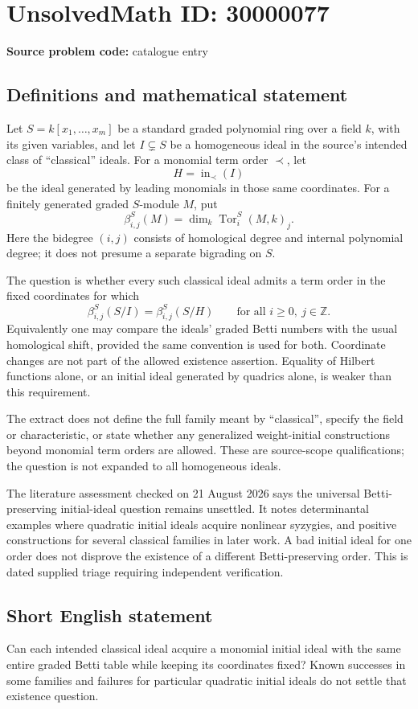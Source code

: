 \documentclass[11pt]{article}
\newcommand{\Z}{\mathbb{Z}}
\begin{document}
\section*{UnsolvedMath ID: 30000077}
\textbf{Source problem code:} catalogue entry
\subsection{Definitions and mathematical statement}
Let $S=k[x_1,\ldots,x_m]$ be a standard graded polynomial ring over a field $k$, with its given variables, and let $I\subsetneq S$ be a homogeneous ideal in the source's intended class of ``classical'' ideals. For a monomial term order $\prec$, let
\[
 H=\operatorname{in}_{\prec}(I)
\]
be the ideal generated by leading monomials in those same coordinates. For a finitely generated graded $S$-module $M$, put
\[
 \beta^S_{i,j}(M)=\dim_k\operatorname{Tor}^S_i(M,k)_j.
\]
Here the bidegree $(i,j)$ consists of homological degree and internal polynomial degree; it does not presume a separate bigrading on $S$.

The question is whether every such classical ideal admits a term order in the fixed coordinates for which
\[
 \beta^S_{i,j}(S/I)=\beta^S_{i,j}(S/H)
 \qquad\text{for all }i\ge0,\ j\in\Z.
\]
Equivalently one may compare the ideals' graded Betti numbers with the usual homological shift, provided the same convention is used for both. Coordinate changes are not part of the allowed existence assertion. Equality of Hilbert functions alone, or an initial ideal generated by quadrics alone, is weaker than this requirement.

The extract does not define the full family meant by ``classical'', specify the field or characteristic, or state whether any generalized weight-initial constructions beyond monomial term orders are allowed. These are source-scope qualifications; the question is not expanded to all homogeneous ideals.

The literature assessment checked on 21 August 2026 says the universal Betti-preserving initial-ideal question remains unsettled. It notes determinantal examples where quadratic initial ideals acquire nonlinear syzygies, and positive constructions for several classical families in later work. A bad initial ideal for one order does not disprove the existence of a different Betti-preserving order. This is dated supplied triage requiring independent verification.
\subsection{Short English statement}
Can each intended classical ideal acquire a monomial initial ideal with the same entire graded Betti table while keeping its coordinates fixed? Known successes in some families and failures for particular quadratic initial ideals do not settle that existence question.
\end{document}
